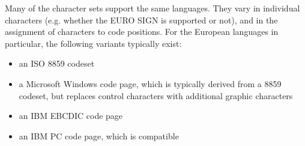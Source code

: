 Many of the character sets support the same languages. They vary in
individual characters (e.g. whether the EURO SIGN is supported or
not), and in the assignment of characters to code positions. For the
European languages in particular, the following variants typically
exist:

\begin{itemize}
\item an ISO 8859 codeset
\item a Microsoft Windows code page, which is typically derived from
      a 8859 codeset, but replaces control characters with additional
      graphic characters
\item an IBM EBCDIC code page
\item an IBM PC code page, which is \ASCII{} compatible
\end{itemize}

